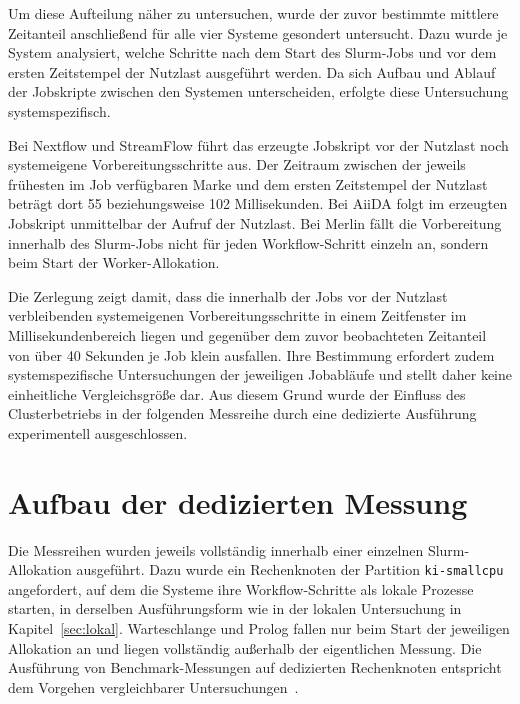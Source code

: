 Um diese Aufteilung näher zu untersuchen, wurde der zuvor bestimmte mittlere Zeitanteil anschließend für alle vier Systeme gesondert untersucht. Dazu wurde je System analysiert, welche Schritte nach dem Start des Slurm-Jobs und vor dem ersten Zeitstempel der Nutzlast ausgeführt werden. Da sich Aufbau und Ablauf der Jobskripte
zwischen den Systemen unterscheiden, erfolgte diese Untersuchung
systemspezifisch.

Bei Nextflow und StreamFlow führt das erzeugte Jobskript vor der
Nutzlast noch systemeigene Vorbereitungsschritte aus. Der Zeitraum zwischen der
jeweils frühesten im Job verfügbaren Marke und dem ersten
Zeitstempel der Nutzlast beträgt dort 55 beziehungsweise
102 Millisekunden. Bei AiiDA folgt im erzeugten Jobskript unmittelbar der Aufruf der Nutzlast. Bei Merlin fällt die Vorbereitung innerhalb des Slurm-Jobs nicht für jeden
Workflow-Schritt einzeln an, sondern beim Start der Worker-Allokation.


Die Zerlegung zeigt damit, dass die innerhalb der Jobs vor der
Nutzlast verbleibenden systemeigenen Vorbereitungsschritte in einem
Zeitfenster im Millisekundenbereich liegen und
gegenüber dem zuvor beobachteten Zeitanteil von über 40 Sekunden je
Job klein ausfallen. Ihre Bestimmung erfordert zudem systemspezifische Untersuchungen der
jeweiligen Jobabläufe und stellt daher keine einheitliche
Vergleichsgröße dar. Aus diesem Grund wurde der Einfluss des
Clusterbetriebs in der folgenden Messreihe durch eine dedizierte Ausführung experimentell ausgeschlossen.



\section{Aufbau der dedizierten Messung}
\label{sec:mogon:dediziert}

\begin{sloppypar}
Die Messreihen wurden jeweils vollständig innerhalb einer einzelnen
Slurm-Allokation ausgeführt. Dazu wurde ein Rechenknoten der
Partition \texttt{ki-smallcpu} angefordert, auf dem die Systeme
ihre Workflow-Schritte als lokale Prozesse starten, in derselben
Ausführungsform wie in der lokalen Untersuchung in
Kapitel~\ref{sec:lokal}. Warteschlange und Prolog fallen nur beim
Start der jeweiligen Allokation an und liegen vollständig außerhalb
der eigentlichen Messung. Die Ausführung von Benchmark-Messungen
auf dedizierten Rechenknoten entspricht dem Vorgehen vergleichbarer
Untersuchungen~\cite[S.~103]{wfbench2022}.
\end{sloppypar}

